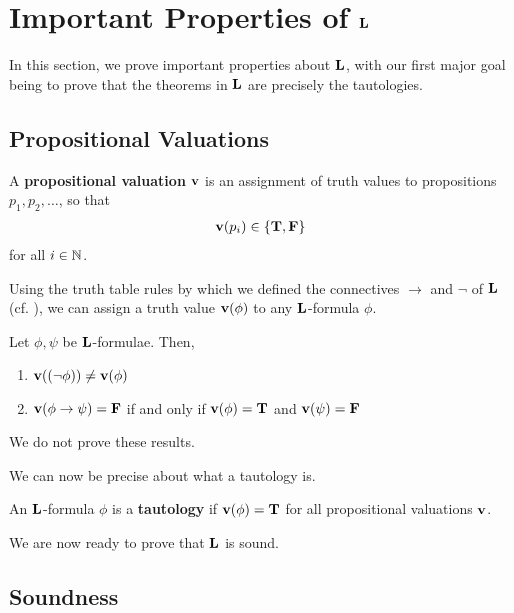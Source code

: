 \section{Important Properties of $\mathbf{L}$}

In this section, we prove important properties about $\mathbf{L}$, with our first major goal being to prove that the theorems in $\mathbf{L}$ are precisely the tautologies.

\subsection{Propositional Valuations}

\begin{boxdefinition}
    A \textbf{propositional valuation} $\mathbf{v}$ is an assignment of truth values to propositions $p_1, p_2, \ldots$, so that
    \begin{align*}
        \mathbf{v}\!\left( p_i \right) \in \left\{ \mathbf{T}, \mathbf{F} \right\}
    \end{align*}
    for all $i \in \mathbb{N}$.
\end{boxdefinition}

Using the truth table rules by which we defined the connectives $\to$ and $\neg$ of $\mathbf{L}$ (cf. ), we can assign a truth value $\mathbf{v}\!\left( \phi \right)$ to any $\mathbf{L}$-formula $\phi$.

\begin{boxlemma}\label{Ch1:Lemma:PropValBhv}
    Let $\phi, \psi$ be $\mathbf{L}$-formulae. Then,
    \begin{enumerate}
        \item $\mathbf{v}\!\left( \left( \neg \phi \right) \right) \neq \mathbf{v}\!\left( \phi \right)$
        \item $\mathbf{v}\!\left( \phi \to \psi \right) = \mathbf{F}$ if and only if $\mathbf{v}\!\left( \phi \right) = \mathbf{T}$ and $\mathbf{v}\!\left( \psi \right) = \mathbf{F}$
    \end{enumerate}
\end{boxlemma}

We do not prove these results.

We can now be precise about what a tautology is.

\begin{boxdefinition}[Tautology]
    An $\mathbf{L}$-formula $\phi$ is a \textbf{tautology} if $\mathbf{v}\!\left( \phi \right) = \mathbf{T}$ for all propositional valuations $\mathbf{v}$.
\end{boxdefinition}

We are now ready to prove that $\mathbf{L}$ is sound.

\subsection{Soundness}

